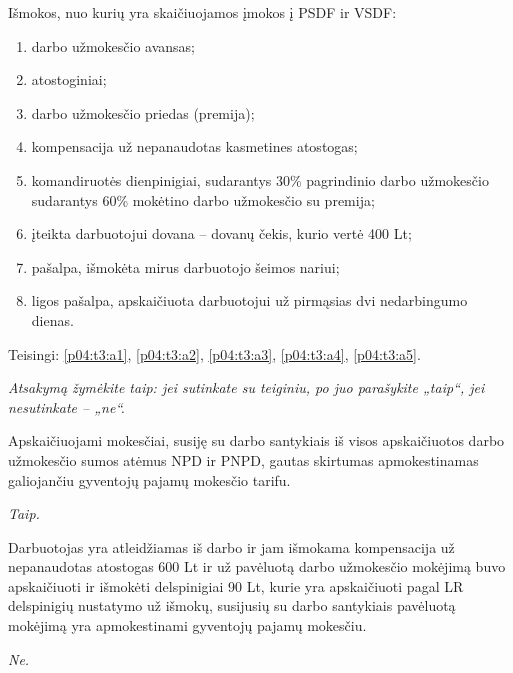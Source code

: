 \begin{tasks}
  \begin{task}
    \begin{condition}
      Išmokos, nuo kurių yra skaičiuojamos įmokos į PSDF ir VSDF:
      \begin{enumerate}
        \item \label{p04:t3:a1} darbo užmokesčio avansas;
        \item \label{p04:t3:a2} atostoginiai;
        \item \label{p04:t3:a3} darbo užmokesčio priedas (premija);
        \item \label{p04:t3:a4} kompensacija už nepanaudotas kasmetines
          atostogas;
        \item \label{p04:t3:a5} komandiruotės dienpinigiai, sudarantys
          30\% pagrindinio darbo užmokesčio sudarantys 60\% mokėtino
          darbo užmokesčio su premija;
        \item \label{p04:t3:a6} įteikta darbuotojui dovana – dovanų
          čekis, kurio vertė 400 Lt;
        \item \label{p04:t3:a7} pašalpa, išmokėta mirus darbuotojo
          šeimos nariui;
        \item \label{p04:t3:a8} ligos pašalpa, apskaičiuota
          darbuotojui už pirmąsias dvi nedarbingumo dienas.
      \end{enumerate}
    \end{condition}
    \begin{solution}
      Teisingi: \ref{p04:t3:a1}, \ref{p04:t3:a2}, \ref{p04:t3:a3},
      \ref{p04:t3:a4}, \ref{p04:t3:a5}.
    \end{solution}
  \end{task}

  \emph{Atsakymą žymėkite taip: jei sutinkate su teiginiu, po
  juo parašykite „taip“, jei nesutinkate – „ne“.}

  \begin{task}
    \begin{condition}
      Apskaičiuojami mokesčiai, susiję su darbo santykiais iš visos
      apskaičiuotos darbo užmokesčio sumos atėmus NPD ir PNPD,
      gautas skirtumas apmokestinamas galiojančiu gyventojų pajamų
      mokesčio tarifu.
    \end{condition}
    \begin{solution}
      \emph{Taip.}
    \end{solution}
  \end{task}

  \begin{task}
    \begin{condition}
      Darbuotojas yra atleidžiamas iš darbo ir jam išmokama
      kompensacija už nepanaudotas atostogas 600 Lt ir už pavėluotą
      darbo užmokesčio mokėjimą buvo apskaičiuoti ir išmokėti
      delspinigiai 90 Lt, kurie yra apskaičiuoti pagal LR
      delspinigių nustatymo už išmokų, susijusių su darbo santykiais
      pavėluotą mokėjimą yra apmokestinami gyventojų pajamų
      mokesčiu.
    \end{condition}
    \begin{solution}
      \emph{Ne.}
    \end{solution}
  \end{task}


\end{tasks}
